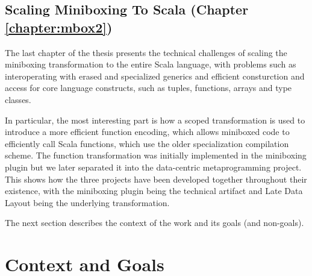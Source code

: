 %
%

\subsection{Scaling Miniboxing To Scala (Chapter \ref{chapter:mbox2})}

The last chapter of the thesis presents the technical challenges of scaling the miniboxing transformation to the entire Scala language, with problems such as interoperating with erased and specialized generics and efficient consturction and access for core language constructs, such as tuples, functions, arrays and type classes.

In particular, the most interesting part is how a scoped transformation is used to introduce a more efficient function encoding, which allows miniboxed code to efficiently call Scala functions, which use the older specialization compilation scheme. The function transformation was initially implemented in the miniboxing plugin but we later separated it into the data-centric metaprogramming project. This shows how the three projects have been developed together throughout their existence, with the miniboxing plugin being the technical artifact and Late Data Layout being the underlying transformation.

The next section describes the context of the work and its goals (and non-goals).

\section{Context and Goals}

